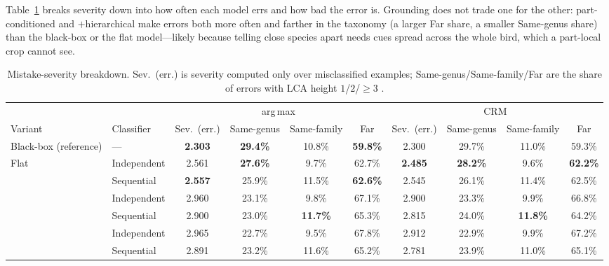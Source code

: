 Table~\ref{tab:severity-breakdown} breaks severity down into how often each
model errs and how bad the error is. Grounding does not trade one for the
other: part-conditioned and $+$hierarchical make errors both more often and
farther in the taxonomy (a larger Far share, a smaller Same-genus share)
than the black-box or the flat model---likely because telling close species
apart needs cues spread across the whole bird, which a part-local crop
cannot see.

\begin{table}[t]
  \centering
  \footnotesize
  \setlength{\tabcolsep}{4pt}
  \caption{Mistake-severity breakdown. Sev.\ (err.) is severity computed only
  over misclassified examples; Same-genus/Same-family/Far are the share of
  errors with LCA height $1$/$2$/$\geq 3$ \citep{bertinetto2020making}.}
  \label{tab:severity-breakdown}
  \begin{tabular}{llcccccccc}
    \toprule
    & & \multicolumn{4}{c}{arg\,max} & \multicolumn{4}{c}{CRM} \\
    \cmidrule(lr){3-6}\cmidrule(lr){7-10}
    Variant & Classifier & Sev.\ (err.) & Same-genus & Same-family & Far
                         & Sev.\ (err.) & Same-genus & Same-family & Far \\
    \midrule
    Black-box (reference) & --- & \textbf{2.303} & \textbf{29.4\%} & 10.8\% & \textbf{59.8\%}
                                 & 2.300 & 29.7\% & 11.0\% & 59.3\% \\
    \midrule
    \multirow{2}{*}{Flat}
      & Independent & 2.561 & \textbf{27.6\%} & 9.7\%  & 62.7\% & \textbf{2.485} & \textbf{28.2\%} & 9.6\%  & \textbf{62.2\%} \\
      & Sequential  & \textbf{2.557} & 25.9\% & 11.5\% & \textbf{62.6\%} & 2.545 & 26.1\% & 11.4\% & 62.5\% \\
    \addlinespace
    \multirow{2}{*}{Part-conditioned}
      & Independent & 2.960 & 23.1\% & 9.8\%  & 67.1\% & 2.900 & 23.3\% & 9.9\%  & 66.8\% \\
      & Sequential  & 2.900 & 23.0\% & \textbf{11.7\%} & 65.3\% & 2.815 & 24.0\% & \textbf{11.8\%} & 64.2\% \\
    \addlinespace
    \multirow{2}{*}{\;+ hierarchical concepts}
      & Independent & 2.965 & 22.7\% & 9.5\%  & 67.8\% & 2.912 & 22.9\% & 9.9\%  & 67.2\% \\
      & Sequential  & 2.891 & 23.2\% & 11.6\% & 65.2\% & 2.781 & 23.9\% & 11.0\% & 65.1\% \\
    \bottomrule
  \end{tabular}
\end{table}

